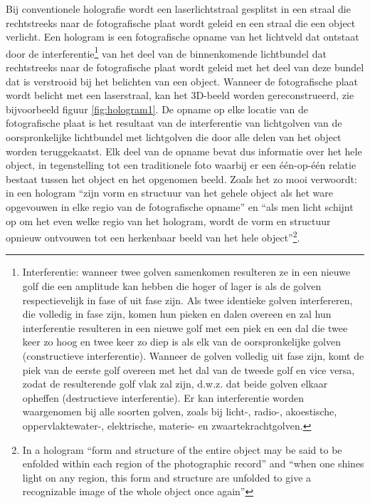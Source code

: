 \documentclass[
  11pt,
]{book}
\begin{document}
Bij conventionele holografie wordt een laserlichtstraal gesplitst in een straal die rechtstreeks naar de fotografische plaat wordt geleid en een straal die een object verlicht. Een hologram is een fotografische opname van het lichtveld dat ontstaat door de interferentie\footnote{Interferentie: wanneer twee golven samenkomen resulteren ze in een nieuwe golf die een amplitude kan hebben die hoger of lager is als de golven respectievelijk in fase of uit fase zijn. Als twee identieke golven interfereren, die volledig in fase zijn, komen hun pieken en dalen overeen en zal hun interferentie resulteren in een nieuwe golf met een piek en een dal die twee keer zo hoog en twee keer zo diep is als elk van de oorspronkelijke golven (constructieve interferentie). Wanneer de golven volledig uit fase zijn, komt de piek van de eerste golf overeen met het dal van de tweede golf en vice versa, zodat de resulterende golf vlak zal zijn, d.w.z. dat beide golven elkaar opheffen (destructieve interferentie). Er kan interferentie worden waargenomen bij alle soorten golven, zoals bij licht-, radio-, akoestische, oppervlaktewater-, elektrische, materie- en zwaartekrachtgolven.} van het deel van de binnenkomende lichtbundel dat rechtstreeks naar de fotografische plaat wordt geleid met het deel van deze bundel dat is verstrooid bij het belichten van een object. Wanneer de fotografische plaat wordt belicht met een laserstraal, kan het 3D-beeld worden gereconstrueerd, zie bijvoorbeeld figuur \ref{fig:hologram1}. De opname op elke locatie van de fotografische plaat is het resultaat van de interferentie van lichtgolven van de oorspronkelijke lichtbundel met lichtgolven die door alle delen van het object worden teruggekaatst. Elk deel van de opname bevat dus informatie over het hele object, in tegenstelling tot een traditionele foto waarbij er een één-op-één relatie bestaat tussen het object en het opgenomen beeld. Zoals \citet{bohm1980} het zo mooi verwoordt: in een hologram ``zijn vorm en structuur van het gehele object als het ware opgevouwen in elke regio van de fotografische opname'' en ``als men licht schijnt op om het even welke regio van het hologram, wordt de vorm en structuur opnieuw ontvouwen tot een herkenbaar beeld van het hele object''\footnote{In a hologram ``form and structure of the entire object may be said to be enfolded within each region of the photographic record'' and ``when one shines light on any region, this form and structure are unfolded to give a recognizable image of the whole object once again''}.
\end{document}
